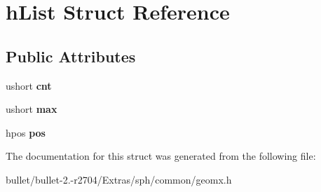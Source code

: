 \hypertarget{structh_list}{\section{h\+List Struct Reference}
\label{structh_list}
}
\subsection*{Public Attributes}
\begin{DoxyCompactItemize}
\item 
\hypertarget{structh_list_a63e2af8dde10e32ce3c859a77498fbb6}{ushort {\bfseries cnt}}\label{structh_list_a63e2af8dde10e32ce3c859a77498fbb6}

\item 
\hypertarget{structh_list_ad2904ee9f1a6d2fe1e93aa089319c51c}{ushort {\bfseries max}}\label{structh_list_ad2904ee9f1a6d2fe1e93aa089319c51c}

\item 
\hypertarget{structh_list_a3f4e081247ef9d7ca3214c7a3eb22f15}{hpos {\bfseries pos}}\label{structh_list_a3f4e081247ef9d7ca3214c7a3eb22f15}

\end{DoxyCompactItemize}


The documentation for this struct was generated from the following file\+:\begin{DoxyCompactItemize}
\item 
bullet/bullet-\/2.-\/r2704/\+Extras/sph/common/geomx.\+h\end{DoxyCompactItemize}
